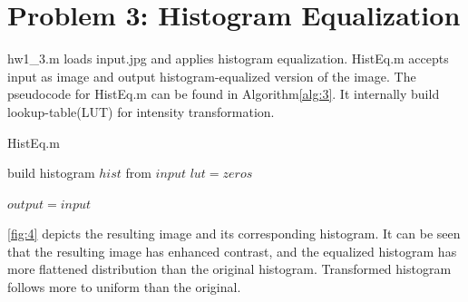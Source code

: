 \documentclass[extendedabs]{bmvc2k}
\begin{document}
\section*{Problem 3: Histogram Equalization}

hw1\_3.m loads input.jpg and applies histogram equalization.
HistEq.m accepts input as image and output histogram-equalized version of the image.
The pseudocode for HistEq.m can be found in Algorithm\ref{alg:3}. It internally
build lookup-table(LUT) for intensity transformation.

\begin{algorithm}
\caption{HistEq.m}
\label{alg:3}
build histogram $hist$ from $input$\;
$lut = zeros$\;
    

$output = input$\;
\end{algorithm}

\figurename{\ref{fig:4}} depicts the resulting image and its corresponding histogram. 
It can be seen that the resulting image has enhanced contrast, and the equalized histogram
has more flattened distribution than the original histogram.
Transformed histogram follows more to uniform than the original. 
\end{document}
